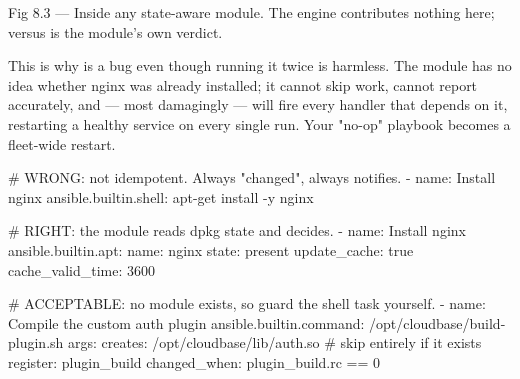 \begin{wbfigure}{Fig 8.3 — Inside any state-aware module. The engine contributes nothing here;  versus  is the module's own verdict.}
\end{wbfigure}

This is why  is a bug even though running it twice is harmless. The module has no idea whether nginx was already installed; it cannot skip work, cannot report accurately, and --- most damagingly --- will fire every handler that depends on it, restarting a healthy service on every single run. Your "no-op" playbook becomes a fleet-wide restart.

\begin{ansiblebox}
# WRONG: not idempotent. Always "changed", always notifies.
- name: Install nginx
  ansible.builtin.shell: apt-get install -y nginx

# RIGHT: the module reads dpkg state and decides.
- name: Install nginx
  ansible.builtin.apt:
    name: nginx
    state: present
    update_cache: true
    cache_valid_time: 3600

# ACCEPTABLE: no module exists, so guard the shell task yourself.
- name: Compile the custom auth plugin
  ansible.builtin.command: /opt/cloudbase/build-plugin.sh
  args:
    creates: /opt/cloudbase/lib/auth.so   # skip entirely if it exists
  register: plugin_build
  changed_when: plugin_build.rc == 0
\end{ansiblebox}

